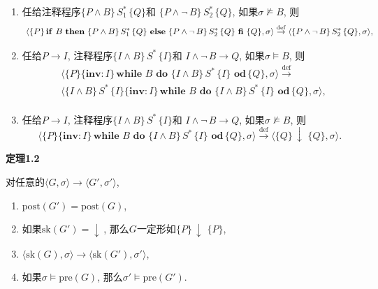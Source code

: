 \documentclass[UTF8]{ctexart}
\begin{document}
\begin{enumerate}
\[        \langle\{P\land B\}\,S_1^*\,\{Q\},\sigma\rangle,\\[1pt]
    \]
    \item 任给注释程序$\{P\land B\}\,S_1^*\,\{Q\}$和
    $\{P\land\neg\,B\}\,S_2^*\,\{Q\}$, 如果$\sigma\not\models B$, 则
    \vspace{1pt}
    \[
        \,\,\langle\{P\}\,\mathbf{if}\,\,B\,\,\mathbf{then}\,\,
        \{P\land B\}\,S_1^*\,\{Q\}\,\,\mathbf{else}\,\,\{P\land\neg\,B\}\,S_2^*
        \,\{Q\}\,\,\mathbf{fi}\,\,\{Q\},\sigma\rangle\overset{\mathrm{def}}{\to}
        \langle\{P\land\neg\,B\}\,S_2^*\,\{Q\},\sigma\rangle,\\[1pt]
    \]
    \item 任给$P\to I$, 注释程序$\{I\land B\}\,S^*\,\{I\}$和
    $I\land\neg\,B\to Q$, 如果$\sigma\models B$, 则
    \vspace{1pt}
    \[\begin{aligned}
        &\langle\{P\}\{\mathbf{inv}:I\}\,\mathbf{while}\,\,B\,\,\mathbf{do}\,\,
        \{I\land B\}\,S^*\,\{I\}\,\,\mathbf{od}\,\{Q\},
        \sigma\rangle\overset{\mathrm{def}}{\to}\\[-3pt]
        &\langle\{I\land B\}\,S^*\,\{I\}\{\mathbf{inv}:I\}\,
        \mathbf{while}\,\,B\,\,\mathbf{do}\,\,
        \{I\land B\}\,S^*\,\{I\}\,\,\mathbf{od}\,\{Q\},
        \sigma\rangle,\\[1pt]
    \end{aligned}\]
    \item 任给$P\to I$, 注释程序$\{I\land B\}\,S^*\,\{I\}$和
    $I\land\neg\,B\to Q$, 如果$\sigma\not\models B$, 则
    \vspace{1pt}
    \[
        \langle\{P\}\{\mathbf{inv}:I\}\,\mathbf{while}\,\,B\,\,\mathbf{do}\,\,
        \{I\land B\}\,S^*\,\{I\}\,\,\mathbf{od}\,\{Q\},
        \sigma\rangle\overset{\mathrm{def}}{\to}
        \langle\{Q\}\,\downarrow\,\,\{Q\},\sigma\rangle.
    \]
\end{enumerate}





\newpage

\hypertarget{sec:定理1.2}{}
\noindent\textbf{定理1.2}

对任意的$\langle G,\sigma\rangle\to\langle G',\sigma'\rangle$,

\begin{enumerate}
    \item $\mathrm{post}(G')=\mathrm{post}(G)$,
    \item 如果$\mathrm{sk}(G')=\downarrow\,$,
    那么$G$一定形如$\{P\}\,\downarrow\,\,\{P\}$,
    \item $\langle\mathrm{sk}(G),\sigma\rangle\to
    \langle\mathrm{sk}(G'),\sigma'\rangle$,
    \item 如果$\sigma\models\mathrm{pre}(G)$,
    那么$\sigma'\models\mathrm{pre}(G')$.
\end{enumerate}
\end{document}
